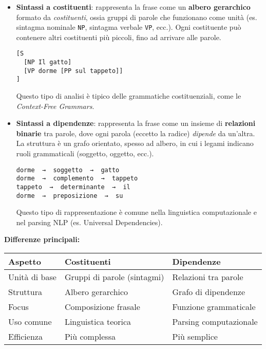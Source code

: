 \begin{itemize}
    \item \textbf{Sintassi a costituenti}: rappresenta la frase come un \textbf{albero gerarchico} formato da \textit{costituenti}, ossia gruppi di parole che funzionano come unità (es. sintagma nominale \texttt{NP}, sintagma verbale \texttt{VP}, ecc.). Ogni costituente può contenere altri costituenti più piccoli, fino ad arrivare alle parole.
    
    \begin{center}
    \begin{minipage}{0.8\textwidth}
    \begin{verbatim}
[S
  [NP Il gatto]
  [VP dorme [PP sul tappeto]]
]
    \end{verbatim}
    \end{minipage}
    \end{center}
    
    Questo tipo di analisi è tipico delle grammatiche costituenziali, come le \textit{Context-Free Grammars}.

    \item \textbf{Sintassi a dipendenze}: rappresenta la frase come un insieme di \textbf{relazioni binarie} tra parole, dove ogni parola (eccetto la radice) \textit{dipende} da un'altra. La struttura è un grafo orientato, spesso ad albero, in cui i legami indicano ruoli grammaticali (soggetto, oggetto, ecc.).

    \begin{center}
    \begin{minipage}{0.8\textwidth}
    \begin{verbatim}
dorme  →  soggetto  →  gatto
dorme  →  complemento  →  tappeto
tappeto  →  determinante  →  il
dorme  →  preposizione  →  su
    \end{verbatim}
    \end{minipage}
    \end{center}

    Questo tipo di rappresentazione è comune nella linguistica computazionale e nel parsing NLP (es. Universal Dependencies).
\end{itemize}

\medskip
\noindent
\textbf{Differenze principali:}

\begin{center}
\begin{tabular}{|l|l|l|}
\hline
\textbf{Aspetto} & \textbf{Costituenti} & \textbf{Dipendenze} \\
\hline
Unità di base & Gruppi di parole (sintagmi) & Relazioni tra parole \\
Struttura & Albero gerarchico & Grafo di dipendenze \\
Focus & Composizione frasale & Funzione grammaticale \\
Uso comune & Linguistica teorica & Parsing computazionale \\
Efficienza & Più complessa & Più semplice \\
\hline
\end{tabular}
\end{center}

